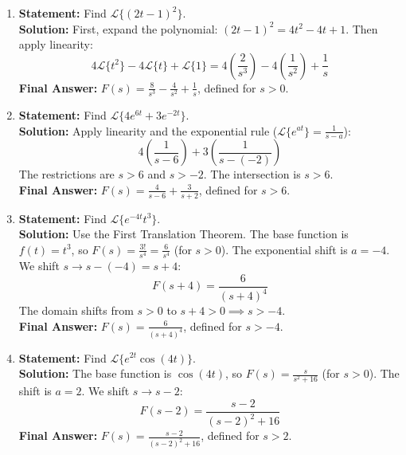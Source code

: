 \documentclass[11pt, letterpaper]{article}
\theoremstyle{definition}
\theoremstyle{remark}
\begin{document}
\begin{enumerate}[label=\textbf{Solution \arabic*.}, leftmargin=*]
    \item \textbf{Statement:} Find $\mathscr{L}\{(2t-1)^2\}$.\\
    \textbf{Solution:} First, expand the polynomial: $(2t-1)^2 = 4t^2 - 4t + 1$. Then apply linearity:
    \[
    4\mathscr{L}\{t^2\} - 4\mathscr{L}\{t\} + \mathscr{L}\{1\} = 4\left(\frac{2}{s^3}\right) - 4\left(\frac{1}{s^2}\right) + \frac{1}{s}
    \]
    \textbf{Final Answer:} $F(s) = \frac{8}{s^3} - \frac{4}{s^2} + \frac{1}{s}$, defined for $s > 0$.

    \item \textbf{Statement:} Find $\mathscr{L}\{4e^{6t} + 3e^{-2t}\}$.\\
    \textbf{Solution:} Apply linearity and the exponential rule ($\mathscr{L}\{e^{at}\} = \frac{1}{s-a}$):
    \[
    4\left(\frac{1}{s-6}\right) + 3\left(\frac{1}{s - (-2)}\right)
    \]
    The restrictions are $s > 6$ and $s > -2$. The intersection is $s > 6$.\\
    \textbf{Final Answer:} $F(s) = \frac{4}{s-6} + \frac{3}{s+2}$, defined for $s > 6$.

    \item \textbf{Statement:} Find $\mathscr{L}\{e^{-4t}t^3\}$.\\
    \textbf{Solution:} Use the First Translation Theorem. The base function is $f(t) = t^3$, so $F(s) = \frac{3!}{s^4} = \frac{6}{s^4}$ (for $s > 0$). The exponential shift is $a = -4$. We shift $s \to s - (-4) = s + 4$:
    \[
    F(s+4) = \frac{6}{(s+4)^4}
    \]
    The domain shifts from $s > 0$ to $s+4 > 0 \implies s > -4$.\\
    \textbf{Final Answer:} $F(s) = \frac{6}{(s+4)^4}$, defined for $s > -4$.

    \item \textbf{Statement:} Find $\mathscr{L}\{e^{2t}\cos(4t)\}$.\\
    \textbf{Solution:} The base function is $\cos(4t)$, so $F(s) = \frac{s}{s^2 + 16}$ (for $s > 0$). The shift is $a = 2$. We shift $s \to s - 2$:
    \[
    F(s-2) = \frac{s-2}{(s-2)^2 + 16}
    \]
    \textbf{Final Answer:} $F(s) = \frac{s-2}{(s-2)^2 + 16}$, defined for $s > 2$.


\end{enumerate}
\end{document}
